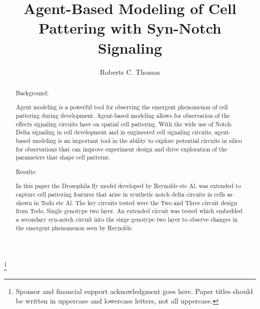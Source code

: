  
\usepackage{graphicx}      %
\usepackage{natbib}        %


\begin{frontmatter}

\title{Agent-Based Modeling of Cell Pattering with Syn-Notch Signaling} 

\thanks[footnoteinfo]{Sponsor and financial support acknowledgment
goes here. Paper titles should be written in uppercase and lowercase
letters, not all uppercase.}

\author[First]{Roberts C. Thomas} 


\address[First]{Cornell University, 
   Ithaca, NY 14850 USA (e-mail: tcr55@cornell.edu).}


\begin{abstract}      %

{\large Background:}

Agent modeling is a powerful tool for observing the emergent phenomenon of cell pattering during development. Agent-based modeling allows for observation of the effects signaling circuits have on spatial cell pattering. With the wide use of Notch-Delta signaling in cell development and in engineered cell signaling circuits, agent-based modeling is an important tool in the ability to explore potential circuits in silico for observations that can improve experiment design and drive exploration of the parameters that shape cell patterns.

{\large Results:}

In this paper the Drosophila fly model developed by Reynolds etc Al. was extended to capture cell pattering features that arise in synthetic notch delta circuits in cells as shown in Todo etc Al. The key circuits tested were the Two and Three circuit design from Todo, Single genotype two layer. An extended circuit was tested which embedded a secondary syn-notch circuit into the singe genotype two layer to observe changes in the emergent phenomenon seen by Reynolds.


\end{abstract}
\end{frontmatter}
